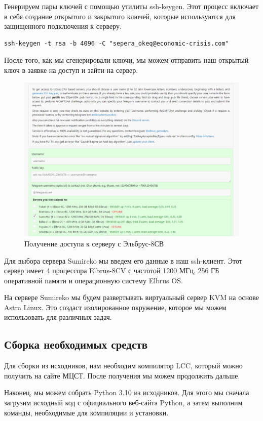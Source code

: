Генерируем пары ключей с помощью утилиты ssh-keygen. Этот процесс включает в себя создание открытого и закрытого ключей, которые используются для защищенного подключения к серверу. 

\begin{verbatim}
ssh-keygen -t rsa -b 4096 -C "sepera_okeq@economic-crisis.com"
\end{verbatim}

После того, как мы сгенерировали ключи, мы можем отправить наш открытый ключ в заявке на доступ и зайти на сервер.

\begin{figure}
  \centering
  \includegraphics[width=.9\textwidth]{graphics/img/elbrus_dostyp.png}
  \caption{Получение доступа к серверу с Эльбрус-8СВ}
  \label{fig:elbrus-dostup}
\end{figure}

Для выбора сервера Sumireko мы введем его данные в наш ssh-клиент. Этот сервер имеет 4 процессора Elbrus-8CV с частотой 1200 МГц, 256 ГБ оперативной памяти и операционную систему Elbrus OS.

На сервере Sumireko мы будем развертывать виртуальный сервер KVM на основе Astra Linux. Это создаст изолированное окружение, которое мы можем использовать для различных задач.

\subsection{Сборка необходимых средств}

Для сборки из исходников, нам необходим компилятор LCC, который можно получить на сайте МЦСТ. После получения мы можем продолжить дальше.

Наконец, мы можем собрать Python 3.10 из исходников. Для этого мы сначала загрузим исходный код с официального веб-сайта Python, а затем выполним команды, необходимые для компиляции и установки.


